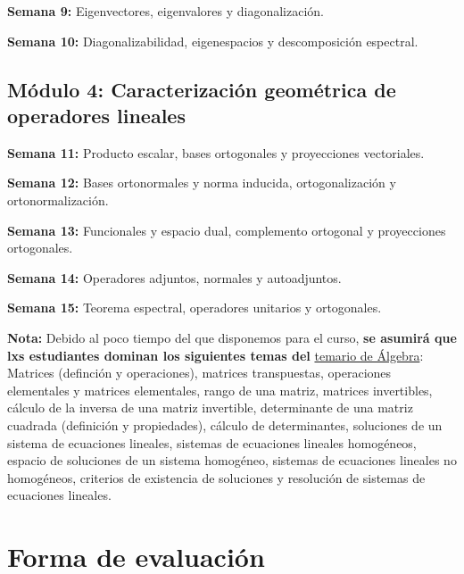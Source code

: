 \textbf{Semana 9:} Eigenvectores, eigenvalores y diagonalización.

\vspace{3mm}
\textbf{Semana 10:} Diagonalizabilidad, eigenespacios y descomposición espectral.

\subsection*{Módulo 4: Caracterización geométrica de operadores lineales} \label{Ssec: Módulo 4: Caracterización geométrica de operadores lineales}

\textbf{Semana 11:} Producto escalar, bases ortogonales y proyecciones vectoriales.

\vspace{3mm}
\textbf{Semana 12:} Bases ortonormales y norma inducida, ortogonalización y ortonormalización.

\vspace{3mm}
\textbf{Semana 13:} Funcionales y espacio dual, complemento ortogonal y proyecciones ortogonales.

\vspace{3mm}
\textbf{Semana 14:} Operadores adjuntos, normales y autoadjuntos.

\vspace{3mm}
\textbf{Semana 15:} Teorema espectral, operadores unitarios y ortogonales.

\vspace{3mm}
\textbf{Nota:} Debido al poco tiempo del que disponemos para el curso, \textbf{se asumirá que lxs estudiantes dominan los siguientes temas del} \href{https://web.fciencias.unam.mx/asignaturas/1130.pdf}{temario de Álgebra}: Matrices (definción y operaciones), matrices transpuestas, operaciones elementales y matrices elementales, rango de una matriz, matrices invertibles, cálculo de la inversa de una matriz invertible, determinante de una matriz cuadrada (definición y propiedades), cálculo de determinantes, soluciones de un sistema de ecuaciones lineales, sistemas de ecuaciones lineales homogéneos, espacio de soluciones de un sistema homogéneo, sistemas de ecuaciones lineales no homogéneos, criterios de existencia de soluciones y resolución de sistemas de ecuaciones lineales. %

\section*{Forma de evaluación}

